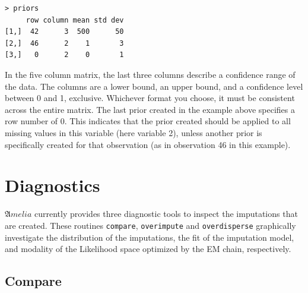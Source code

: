 \documentclass[12pt,titlepage]{article}
\newcommand{\Amelia}{\ensuremath{\mathfrak Amelia} }
\begin{document}
\begin{verbatim}
> priors
     row column mean std dev
[1,]  42      3  500      50
[2,]  46      2    1       3
[3,]   0      2    0       1
\end{verbatim}

In the five column matrix, the last three columns describe a
confidence range of the data. The columns are a lower bound, an upper
bound, and a confidence level between 0 and 1, exclusive.  Whichever
format you choose, it must be consistent across the entire matrix.
The last prior created in the example above specifies a row number of
0.  This indicates that the prior created should be applied to all
missing values in this variable (here variable 2), unless another
prior is specifically created for that observation (as in observation
46 in this example).

\section{Diagnostics}\label{sec:diag}

\Amelia currently provides three diagnostic tools to inspect the imputations
that are created.  These routines \texttt{compare}, \texttt{overimpute} and
\texttt{overdisperse} graphically investigate the distribution of the
imputations, the fit of the imputation model, and modality of the Likelihood
space optimized by the EM chain, respectively.

\subsection{Compare}
\end{document}
